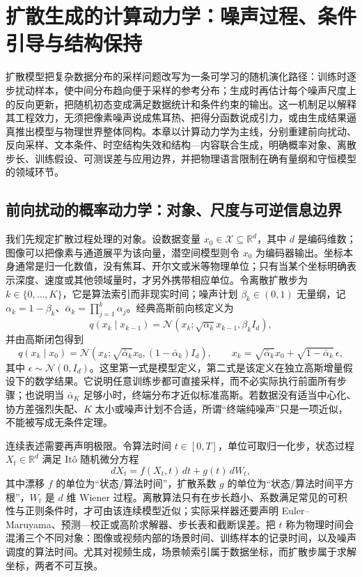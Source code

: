 \chapter{扩散生成的计算动力学：噪声过程、条件引导与结构保持}
\label{chp:diffusion_thermodynamics}

扩散模型把复杂数据分布的采样问题改写为一条可学习的随机演化路径：训练时逐步扰动样本，使中间分布趋向便于采样的参考分布；生成时再估计每个噪声尺度上的反向更新，把随机初态变成满足数据统计和条件约束的输出。这一机制足以解释其工程效力，无须把像素噪声说成焦耳热、把得分函数说成引力，或由生成结果逼真推出模型与物理世界整体同构。本章以计算动力学为主线，分别重建前向扰动、反向采样、文本条件、时空结构失效和结构—内容联合生成，明确概率对象、离散步长、训练假设、可测误差与应用边界，并把物理语言限制在确有量纲和守恒模型的领域环节。

\section{前向扰动的概率动力学：对象、尺度与可逆信息边界}
\label{sec:forward_process_heat_death}

我们先规定扩散过程处理的对象。设数据变量 $x_0\in\mathcal{X}\subseteq\mathbb{R}^d$，其中 $d$ 是编码维数；图像可以把像素与通道展平为该向量，潜空间模型则令 $x_0$ 为编码器输出。坐标本身通常是归一化数值，没有焦耳、开尔文或米等物理单位；只有当某个坐标明确表示深度、速度或其他领域量时，才另外携带相应单位。令离散扩散步为 $k\in\{0,\ldots,K\}$，它是算法索引而非现实时间；噪声计划 $\beta_k\in(0,1)$ 无量纲，记 $\alpha_k=1-\beta_k$、$\bar\alpha_k=\prod_{j=1}^{k}\alpha_j$。经典高斯前向核定义为
\begin{equation}
q(x_k\mid x_{k-1})=\mathcal{N}\!\left(x_k;\sqrt{\alpha_k}x_{k-1},\beta_k I_d\right),
\end{equation}
并由高斯闭包得到
\begin{equation}
q(x_k\mid x_0)=\mathcal{N}\!\left(x_k;\sqrt{\bar\alpha_k}x_0,(1-\bar\alpha_k)I_d\right),\qquad
x_k=\sqrt{\bar\alpha_k}x_0+\sqrt{1-\bar\alpha_k}\,\epsilon,
\end{equation}
其中 $\epsilon\sim\mathcal{N}(0,I_d)$。这里第一式是模型定义，第二式是该定义在独立高斯增量假设下的数学结果。它说明任意训练步都可直接采样，而不必实际执行前面所有步骤；也说明当 $\bar\alpha_K$ 足够小时，终端分布才近似标准高斯。若数据没有适当中心化、协方差强烈失配、$K$ 太小或噪声计划不合适，所谓“终端纯噪声”只是一项近似，不能被写成无条件定理。

连续表述需要再声明极限。令算法时间 $t\in[0,T]$，单位可取归一化步，状态过程 $X_t\in\mathbb{R}^d$ 满足 Itô 随机微分方程
\begin{equation}
dX_t=f(X_t,t)\,dt+g(t)\,dW_t,
\end{equation}
其中漂移 $f$ 的单位为“状态/算法时间”，扩散系数 $g$ 的单位为“状态/算法时间平方根”，$W_t$ 是 $d$ 维 Wiener 过程。离散算法只有在步长趋小、系数满足常见的可积性与正则条件时，才可由该连续模型近似；实际采样器还要声明 Euler--Maruyama、预测—校正或高阶求解器、步长表和截断误差。把 $t$ 称为物理时间会混淆三个不同对象：图像或视频内部的场景时间、训练样本的记录时间，以及噪声调度的算法时间。尤其对视频生成，场景帧索引属于数据坐标，而扩散步属于求解坐标，两者不可互换。

